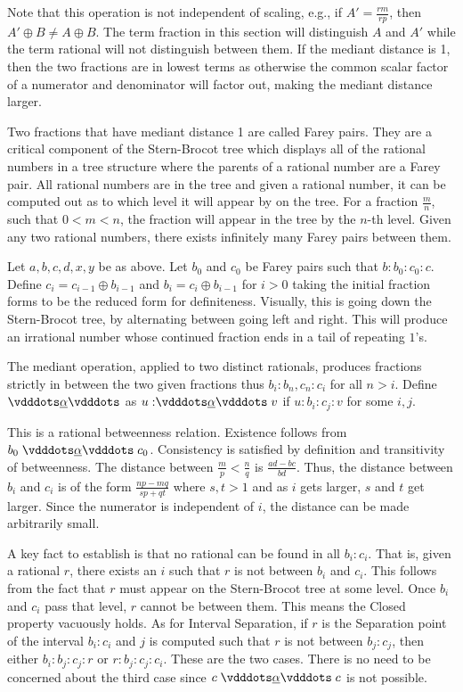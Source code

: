 \documentclass[12pt]{article}
\begin{document}
Note that this operation is not independent of scaling, e.g., if $A' = \frac{rm}{rp}$, then $A' \oplus B \neq A \oplus B$. The term fraction in this section will distinguish $A$ and $A'$ while the term rational will not distinguish between them. If the mediant distance is 1, then the two fractions are in lowest terms as otherwise the common scalar factor of a numerator and denominator will factor out, making the mediant distance larger. 

Two fractions that have mediant distance 1 are called Farey pairs. They are a critical component of the Stern-Brocot tree which displays all of the rational numbers in a tree structure where the parents of a rational number are a Farey pair. All rational numbers are in the tree and given a rational number, it can be computed out as to which level it will appear by on the tree. For a fraction $\frac{m}{n}$, such that $0 < m < n$, the fraction will appear in the tree by the $n$-th level. Given any two rational numbers, there exists infinitely many Farey pairs between them. 

Let $a, b, c, d, x, y$ be as above. Let $b_0$ and $c_0$ be Farey pairs such that $b:b_0:c_0:c$.  Define $c_i = c_{i-1} \oplus b_{i-1}$ and $b_i = c_{i} \oplus b_{i-1}$ for $i > 0$ taking the initial fraction forms to be the reduced form for definiteness.  Visually, this is going down the Stern-Brocot tree, by alternating between going left and right. This will produce an irrational number whose continued fraction ends in a tail of repeating $1$'s. 


The mediant operation, applied to two distinct rationals, produces fractions strictly in between the two given fractions thus $b_i: {b_n, c_n}:c_i$ for all $ n > i$. Define $\xrel[\alpha]$ as $u: \xrel [\alpha] v$ if $u:b_i:c_j:v$ for some $i, j$. 

This is a rational betweenness relation. Existence follows from $b_0 \xrel[\alpha] c_0$. Consistency is satisfied by definition and transitivity of betweenness. The distance between $\frac{m}{p} < \frac{n}{q}$ is $\frac{ad - bc}{bd}$. Thus, the distance between $b_i$ and $c_i$ is of the form $\frac{np - mq}{sp + qt}$ where $s, t > 1$ and as $i$ gets larger, $s$ and $t$ get larger. Since the numerator is independent of $i$, the distance can be made arbitrarily small. 

A key fact to establish is that no rational can be found in all $b_i:c_i$. That is, given a rational $r$, there exists an $i$ such that $r$ is not between $b_i$ and $c_i$. This follows from the fact that $r$ must appear on the Stern-Brocot tree at some level. Once $b_i$ and $c_i$ pass that level, $r$ cannot be between them. This means the Closed property vacuously holds. As for Interval Separation, if $r$ is the Separation point of the interval $b_i:c_i$ and $j$ is computed such that $r$ is not between $b_j:c_j$, then either $b_i:b_j:c_j:r$ or $r:b_j:c_j:c_i$. These are the two cases. There is no need to be concerned about the third case since $c \xrel[\alpha] c$ is not possible. 
\end{document}
